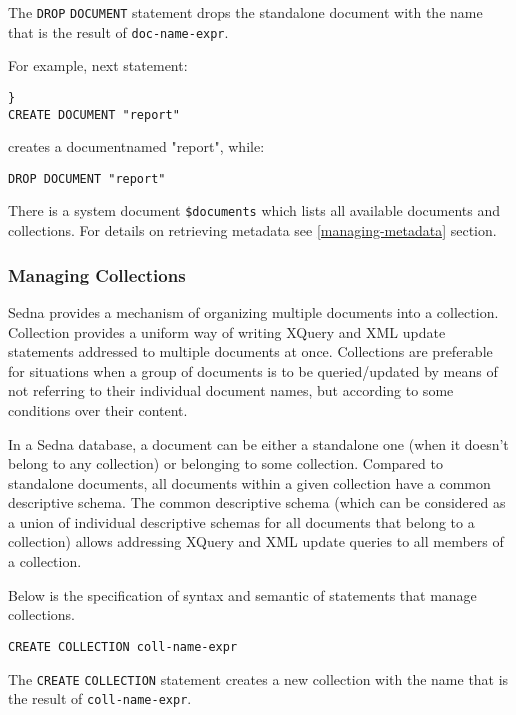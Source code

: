 \documentclass[a4paper,12pt]{article}
\begin{document}
The \verb!DROP! \verb!DOCUMENT! statement drops the standalone document with the
name that is the result of \verb!doc-name-expr!.

For example, next statement: 
\begin{verbatim}}
CREATE DOCUMENT "report"
\end{verbatim}
creates a documentnamed "report", while:
\begin{verbatim}
DROP DOCUMENT "report"
\end{verbatim}

There is a system document \verb!$documents! which lists all available documents
and collections. For details on retrieving metadata see \ref{managing-metadata}
section.


\subsubsection{Managing Collections}

Sedna provides a mechanism of organizing multiple documents into a collection.
Collection provides a uniform way of writing XQuery and XML update statements
addressed to multiple documents at once. Collections are preferable for
situations when a group of documents is to be queried/updated by means of not
referring to their individual document names, but according to some conditions
over their content.

In a Sedna database, a document can be either a standalone one (when it doesn't
belong to any collection) or belonging to some collection. Compared to
standalone documents, all documents within a given collection have a common
descriptive schema. The common descriptive schema (which can be considered as a
union of individual descriptive schemas for all documents that belong to a
collection) allows addressing XQuery and XML update queries to all members of a
collection.

Below is the specification of syntax and semantic of statements that manage
collections.

\begin{verbatim}
CREATE COLLECTION coll-name-expr
\end{verbatim}

The \verb!CREATE! \verb!COLLECTION! statement creates a new collection with the
name that is the result of \verb!coll-name-expr!.
\end{document}
